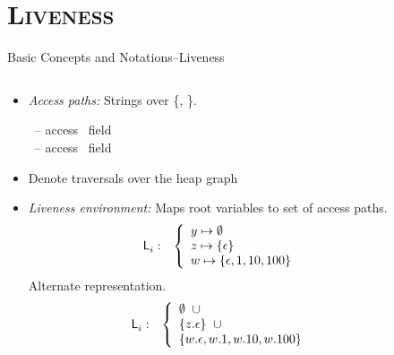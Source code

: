\documentclass[xcolor=x11names,compress,mathserif]{beamer}
\renewcommand{\(}{\begin{columns}}
\renewcommand{\)}{\end{columns}}
\newcommand{\<}[1]{\begin{column}{#1}}
\renewcommand{\>}{\end{column}}
\begin{document}
\section{\scshape Liveness}
\begin{frame}{Basic Concepts and Notations--Liveness }
\small
\begin{columns}
  \begin{column}[T]{0.75\textwidth}
    \begin{itemize}\itemsep0.75em
    \item {\em Access paths:} Strings over \{\acar, \acdr\}.
      
      \hspace*{.25cm}   \acar\  -- access \CAR\ field \\
      \hspace*{.25cm}   \acdr\  -- access \CDR\ field 
    \item Denote traversals over the heap graph
    \item {\em Liveness environment:} 
          {Maps root variables    to set of access paths.
            \begin{eqnarray*}
              \mathsf{L}_{{i}}^{}&:&
              \left\{\begin{array}{l}
              y \mapsto \emptyset\\
              z \mapsto \{\epsilon\}\\
              w \mapsto \{\epsilon, 1, 10, 100\}
              \end{array}\right.
            \end{eqnarray*}
          }
              {Alternate representation.
                \begin{eqnarray*}
                  \mathsf{L}_{{i}}^{}&:&
                  \left\{\begin{array}{l}
                  \emptyset \;\; \cup  \\
                  \{z.\epsilon\} \;\; \cup\\
                  \{w.\epsilon, w.1, w.10, w.100\}
                  \end{array}\right.
                \end{eqnarray*} 
              }
    \end{itemize}
  \end{column}
  \begin{column}[T]{0.25\textwidth}
  \end{column}
\end{columns}

\bigskip
\bigskip

\end{frame}
\end{document}
